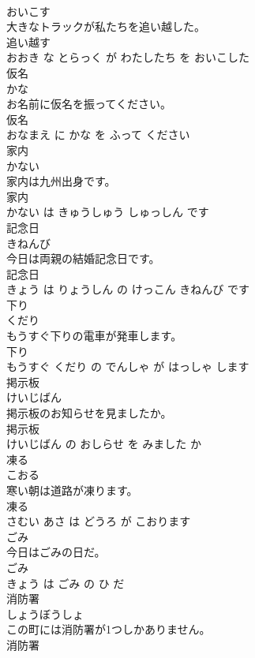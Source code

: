 \documentclass[8pt]{extreport}
\begin{document}
\begin{CJK}{UTF8}{min}
\\	おいこす			
\\	大きなトラックが私たちを追い越した。	
\\	追い越す 
\\	おおき な とらっく が わたしたち を おいこした			
\\	仮名	
\\	かな			
\\	お名前に仮名を振ってください。	
\\	仮名 
\\	おなまえ に かな を ふって ください			
\\	家内	
\\	かない			
\\	家内は九州出身です。	
\\	家内 
\\	かない は きゅうしゅう しゅっしん です			
\\	記念日	
\\	きねんび			
\\	今日は両親の結婚記念日です。	
\\	記念日 
\\	きょう は りょうしん の けっこん きねんび です			
\\	下り	
\\	くだり			
\\	もうすぐ下りの電車が発車します。	
\\	下り 
\\	もうすぐ くだり の でんしゃ が はっしゃ します			
\\	掲示板	
\\	けいじばん			
\\	掲示板のお知らせを見ましたか。	
\\	掲示板 
\\	けいじばん の おしらせ を みました か			
\\	凍る	
\\	こおる			
\\	寒い朝は道路が凍ります。	
\\	凍る 
\\	さむい あさ は どうろ が こおります			
\\	ごみ	
\\	今日はごみの日だ。	
\\	ごみ 
\\	きょう は ごみ の ひ だ			
\\	消防署	
\\	しょうぼうしょ			
\\	この町には消防署が1つしかありません。	
\\	消防署 

\end{CJK}
\end{document}
